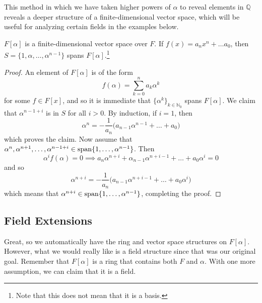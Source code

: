   This method in which we have taken higher powers of $\alpha$ to reveal elements in $\mathbb{Q}$ reveals a deeper structure of a finite-dimensional vector space, which will be useful for analyzing certain fields in the examples below. 

  \begin{lemma}
    $F[\alpha]$ is a finite-dimensional vector space over $F$. If $f(x) = a_n x^n + \ldots a_0$, then $S = \{1, \alpha, \ldots, \alpha^{n-1}\}$ spans $F[\alpha]$.\footnote{Note that this does not mean that it is a basis.} 
  \end{lemma}
  \begin{proof}
    An element of $F[\alpha]$ is of the form 
    \begin{equation}
      f(\alpha) = \sum_{k=0}^n a_k \alpha^k
    \end{equation} 
    for some $f \in F[x]$, and so it is immediate that $\{\alpha^k\}_{k \in \mathbb{N}_0}$ spans $F[\alpha]$. We claim that $\alpha^{n-1+i}$ is in $S$ for all $i > 0$. By induction, if $i = 1$, then 
    \begin{equation}
      \alpha^n = -\frac{1}{a_n} \big( a_{n-1} \alpha^{n-1} + \ldots + a_0 \big)
    \end{equation}
    which proves the claim. Now assume that $\alpha^n, \alpha^{n+1}, \ldots, \alpha^{n-1+i} \in \operatorname{span}\{1, \ldots, \alpha^{n-1}\}$. Then 
    \begin{equation}
      \alpha^i f(\alpha) = 0 \implies a_n \alpha^{n+i} + \alpha_{n-1} \alpha^{n+i-1} + \ldots + a_0 \alpha^i = 0 
    \end{equation}
    and so 
    \begin{equation}
      \alpha^{n+i} = -\frac{1}{a_n} \big(a_{n-1} \alpha^{n+i-1} + \ldots + a_0 \alpha^i)
    \end{equation}
    which means that $\alpha^{n+i} \in \operatorname{span}\{1, \ldots, \alpha^{n-1}\}$, completing the proof. 
  \end{proof} 

\subsection{Field Extensions} 
  
  Great, so we automatically have the ring and vector space structures on $F[\alpha]$. However, what we would really like is a field structure since that was our original goal. Remember that $F[\alpha]$ is a ring that contains both $F$ and $\alpha$. With one more assumption, we can claim that it is a field. 

